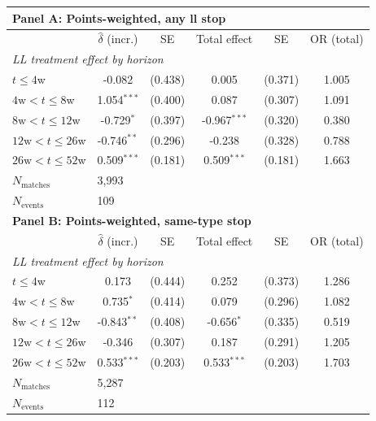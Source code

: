 \begin{tabular}{lccccc}
\toprule
\multicolumn{6}{l}{\textbf{Panel A: Points-weighted, any ll stop}} \\
\midrule
 & $\hat{\delta}$ (incr.) & SE & Total effect & SE & OR (total) \\
\midrule
\multicolumn{6}{l}{\textit{LL treatment effect by horizon}} \\
$t \leq 4$w & -0.082 & (0.438) & 0.005 & (0.371) & 1.005 \\
$4\text{w} < t \leq 8$w & 1.054$^{***}$ & (0.400) & 0.087 & (0.307) & 1.091 \\
$8\text{w} < t \leq 12$w & -0.729$^{*}$ & (0.397) & -0.967$^{***}$ & (0.320) & 0.380 \\
$12\text{w} < t \leq 26$w & -0.746$^{**}$ & (0.296) & -0.238 & (0.328) & 0.788 \\
$26\text{w} < t \leq 52$w & 0.509$^{***}$ & (0.181) & 0.509$^{***}$ & (0.181) & 1.663 \\
[4pt]
$N_{\text{matches}}$ & \multicolumn{5}{l}{3,993} \\
$N_{\text{events}}$ & \multicolumn{5}{l}{109} \\
\midrule
\multicolumn{6}{l}{\textbf{Panel B: Points-weighted, same-type stop}} \\
\midrule
 & $\hat{\delta}$ (incr.) & SE & Total effect & SE & OR (total) \\
\midrule
\multicolumn{6}{l}{\textit{LL treatment effect by horizon}} \\
$t \leq 4$w & 0.173 & (0.444) & 0.252 & (0.373) & 1.286 \\
$4\text{w} < t \leq 8$w & 0.735$^{*}$ & (0.414) & 0.079 & (0.296) & 1.082 \\
$8\text{w} < t \leq 12$w & -0.843$^{**}$ & (0.408) & -0.656$^{*}$ & (0.335) & 0.519 \\
$12\text{w} < t \leq 26$w & -0.346 & (0.307) & 0.187 & (0.291) & 1.205 \\
$26\text{w} < t \leq 52$w & 0.533$^{***}$ & (0.203) & 0.533$^{***}$ & (0.203) & 1.703 \\
[4pt]
$N_{\text{matches}}$ & \multicolumn{5}{l}{5,287} \\
$N_{\text{events}}$ & \multicolumn{5}{l}{112} \\
\bottomrule
\end{tabular}
